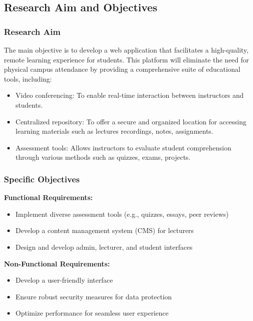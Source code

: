 \documentclass[a4paper,12pt]{article}  %
\begin{document}
\subsection{Research Aim and Objectives}
\subsubsection{Research Aim}
The main objective is to develop a web application that facilitates a
high-quality, remote learning experience for students. This platform will
eliminate the need for physical campus attendance by providing a comprehensive
suite of educational tools, including:\\

\begin{itemize}
      \item Video conferencing: To enable real-time interaction between instructors and
            students.\\
      \item Centralized repository: To offer a secure and organized location for accessing
            learning materials such as lectures recordings, notes, assignments.\\
      \item Assessment tools: Allows instructors to evaluate student comprehension through
            various methods such as quizzes, exams, projects.\\
\end{itemize}

\subsubsection{Specific Objectives}
\textbf{Functional Requirements:}
\begin{itemize}
      \item Implement diverse assessment tools (e.g., quizzes, essays, peer reviews)\\
      \item Develop a content management system (CMS) for lecturers\\
      \item Design and develop admin, lecturer, and student interfaces\\
\end{itemize}

\textbf{Non-Functional Requirements:}
\begin{itemize}
      \item Develop a user-friendly interface\\
      \item Ensure robust security measures for data protection\\
      \item Optimize performance for seamless user experience\\
\end{itemize}
\end{document}
